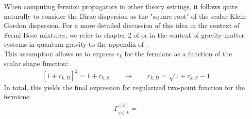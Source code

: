 When computing fermion propagators in other theory settings, it follows quite naturally to consider the Dirac dispersion as the "square root" of the scalar Klein-Gordon dispersion. For a more detailed discussion of this idea in the context of Fermi-Bose mixtures, we refer to chapter 2 of \cite{PawlowskiNPgaugeLecture} or in the context of gravity-matter systems in quantum gravity to the appendix of \cite{BritoHamadaPereiraYamada2019}. \\
This assumption allows us to express $r_k$ for the fermions as a function of the scalar shape function:
\begin{align}
\left[1+r_{k,D}\right]^2 = 1+r_{k,S} \qquad \longrightarrow \qquad r_{k, D} = \sqrt{1+r_{k,S}} - 1
\end{align}
In total, this yields the final expression for regularized two-point function for the fermions:
\begin{align}
	\Gamma^{(2)}_{\bar{\psi}\psi, k} = 
\end{align}
